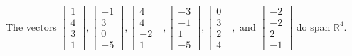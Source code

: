 \begin{exercise}
\begin{exerciseStatement}
  \end{exerciseStatement}
  \begin{exerciseAnswer}
   The vectors \(\left[\begin{array}{r}
1 \\
4 \\
3 \\
1
\end{array}\right] , \left[\begin{array}{r}
-1 \\
3 \\
0 \\
-5
\end{array}\right] , \left[\begin{array}{r}
4 \\
4 \\
-2 \\
1
\end{array}\right] , \left[\begin{array}{r}
-3 \\
-1 \\
1 \\
-5
\end{array}\right] , \left[\begin{array}{r}
0 \\
3 \\
2 \\
4
\end{array}\right] , \text{ and } \left[\begin{array}{r}
-2 \\
-2 \\
2 \\
-1
\end{array}\right]\) 
  	 do  
	span \(\mathbb{R}^4\).
  


  \end{exerciseAnswer}
\end{exercise}